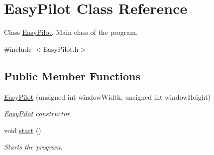 \hypertarget{class_easy_pilot}{}\section{Easy\+Pilot Class Reference}
\label{class_easy_pilot}


Class \hyperlink{class_easy_pilot}{Easy\+Pilot}. Main class of the program.  




{\ttfamily \#include $<$Easy\+Pilot.\+h$>$}

\subsection*{Public Member Functions}
\begin{DoxyCompactItemize}
\item 
\hyperlink{class_easy_pilot_a57d67d98151d0a771ae332011d57e697}{Easy\+Pilot} (unsigned int window\+Width, unsigned int window\+Height)
\begin{DoxyCompactList}\small\item\em \hyperlink{class_easy_pilot}{Easy\+Pilot} constructor. \end{DoxyCompactList}\item 
void \hyperlink{class_easy_pilot_a9797d261e91d7e0c117d2233b443eb25}{start} ()\hypertarget{class_easy_pilot_a9797d261e91d7e0c117d2233b443eb25}{}\label{class_easy_pilot_a9797d261e91d7e0c117d2233b443eb25}

\begin{DoxyCompactList}\small\item\em Starts the program. \end{DoxyCompactList}\end{DoxyCompactItemize}
